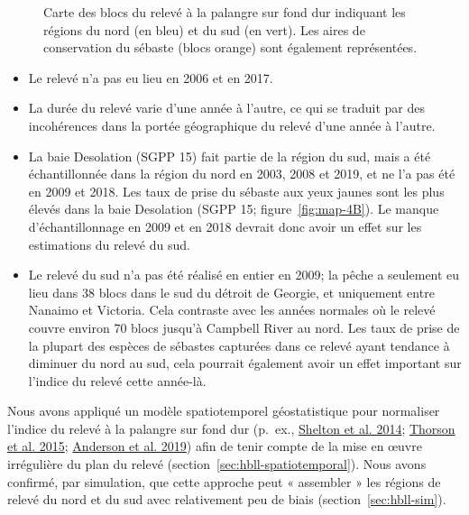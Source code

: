 \documentclass[french,11pt]{book}
\begin{document}
\begin{figure}[htb]

{\centering {} 

}

\caption{Carte des blocs du relevé à la palangre sur fond dur indiquant les régions du nord (en bleu) et du sud (en vert). Les aires de conservation du sébaste (blocs orange) sont également représentées.}\label{fig:map-HBLL-NS}
\end{figure}
\begin{itemize}

\item
  Le relevé n'a pas eu lieu en 2006 et en 2017.
\item
  La durée du relevé varie d'une année à l'autre, ce qui se traduit par des incohérences dans la portée géographique du relevé d'une année à l'autre.
\item
  La baie Desolation (SGPP 15) fait partie de la région du sud, mais a été échantillonnée dans la région du nord en 2003, 2008 et 2019, et ne l'a pas été en 2009 et 2018. Les taux de prise du sébaste aux yeux jaunes sont les plus élevés dans la baie Desolation (SGPP 15; figure~\ref{fig:map-4B}). Le manque d'échantillonnage en 2009 et en 2018 devrait donc avoir un effet sur les estimations du relevé du sud.
\item
  Le relevé du sud n'a pas été réalisé en entier en 2009; la pêche a seulement eu lieu dans 38 blocs dans le sud du détroit de Georgie, et uniquement entre Nanaimo et Victoria. Cela contraste avec les années normales où le relevé couvre environ 70 blocs jusqu'à Campbell River au nord. Les taux de prise de la plupart des espèces de sébastes capturées dans ce relevé ayant tendance à diminuer du nord au sud, cela pourrait également avoir un effet important sur l'indice du relevé cette année-là.
\end{itemize}
Nous avons appliqué un modèle spatiotemporel géostatistique pour normaliser l'indice du relevé à la palangre sur fond dur (p.~ex., \protect\hyperlink{ref-shelton2014}{Shelton et al. 2014}; \protect\hyperlink{ref-thorson2015}{Thorson et al. 2015}; \protect\hyperlink{ref-anderson2019synopsis}{Anderson et al. 2019}) afin de tenir compte de la mise en œuvre irrégulière du plan du relevé (section~\ref{sec:hbll-spatiotemporal}). Nous avons confirmé, par simulation, que cette approche peut « assembler » les régions de relevé du nord et du sud avec relativement peu de biais (section~\ref{sec:hbll-sim}).
\end{document}
